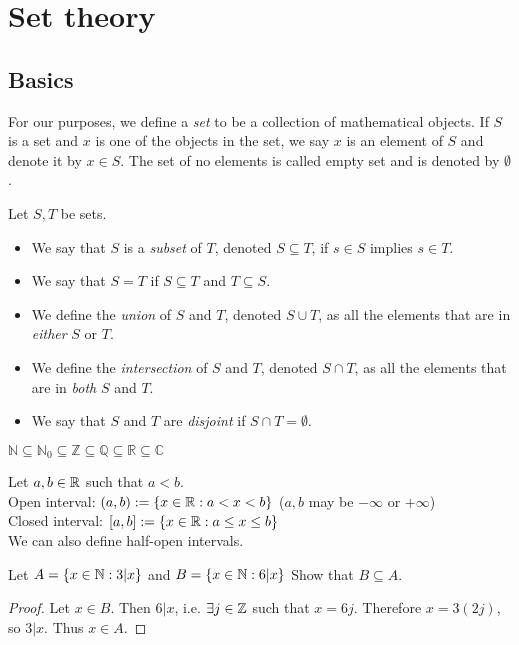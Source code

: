 \documentclass{article}
\begin{document}
\section{Set theory}

\subsection{Basics}

For our purposes, we define a \emph{set} to be a collection of mathematical objects. If $S$ is a set and $x$ is one of the objects in the set, we say $x$ is an element of $S$ and denote it by $x\in S$. The set of no elements is called empty set and is denoted by $\emptyset$.

\begin{definition}
Let $S, T$ be sets. 
\begin{itemize}
    \item We say that $S$ is a \emph{subset} of $T$, denoted $S\subseteq T$, if $s\in S$ implies $s\in T$. 
    \item We say that $S=T$ if $S\subseteq T$ and $T\subseteq S$.
    \item We define the \emph{union} of $S$ and $T$, denoted $S \cup T$, as all the elements that are in \emph{either} $S$ or $T$.
    \item We define the \emph{intersection} of $S$ and $T$, denoted $S \cap T$, as all the elements that are in \emph{both} $S$ and $T$.
    \item We say that $S$ and $T$ are \emph{disjoint} if $S \cap T = \emptyset$.
\end{itemize}
\end{definition}

\begin{example}
$\mathbb{N} \subseteq \mathbb{N}_0 \subseteq \mathbb{Z} \subseteq \mathbb{Q} \subseteq \mathbb{R} \subseteq \mathbb{C}$
\end{example}

\begin{example}  Let $a, b \in {\mathbb{R}}$ such that $a < b$. \\
Open interval: $(a,b) := \{x \in {\mathbb{R}} : a < x < b \}$  ($a,b$ may be $- \infty$ or $+ \infty$)\\
Closed interval: $[a,b] := \{x \in {\mathbb{R}} : a \leq x \leq b \}$ \\
We can also define half-open intervals.  
\end{example}

\begin{example}
Let $A = \{x \in {\mathbb{N}}: 3 | x \}$ and $B = \{x \in {\mathbb{N}}: 6 | x \}$
Show that $B \subseteq A$. 
\end{example}
\begin{proof}
Let $x \in B$. Then $6 |x$, i.e. $\exists j \in {\mathbb{Z}}$ such that $x = 6j$. Therefore $x = 3 (2j)$, so $3|x$. Thus $x \in A$.
\end{proof}
\end{document}
